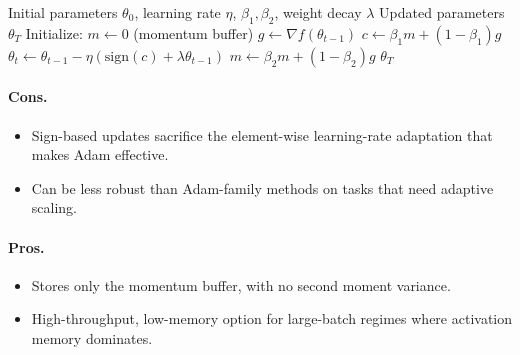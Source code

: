 \begin{algorithm}[H]
\caption{Lion (EvoLved Sign Momentum)}
\label{alg:lion}
\begin{algorithmic}[1]
\Require Initial parameters $\theta_0$, learning rate $\eta$, $\beta_1, \beta_2$, weight decay $\lambda$
\Ensure Updated parameters $\theta_T$
\State Initialize: $m \gets 0$ (momentum buffer)
    \State $g \gets \nabla f(\theta_{t-1})$ 
    \State $c \gets \beta_1 m + (1-\beta_1) g$ 
    \State $\theta_t \gets \theta_{t-1} - \eta (\text{sign}(c) + \lambda \theta_{t-1})$ 
    \State $m \gets \beta_2 m + (1-\beta_2) g$ 
\EndFor
\Return $\theta_T$
\end{algorithmic}
\end{algorithm}

\paragraph{Cons.}
\begin{itemize}[leftmargin=*]
\item Sign-based updates sacrifice the element-wise learning-rate adaptation that makes Adam effective.
\item Can be less robust than Adam-family methods on tasks that need adaptive scaling.
\end{itemize}

\paragraph{Pros.}
\begin{itemize}[leftmargin=*]
\item Stores only the momentum buffer, with no second moment variance.
\item High-throughput, low-memory option for large-batch regimes where activation memory dominates.
\end{itemize}

